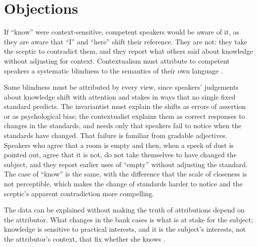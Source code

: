 \documentclass{situationist-preprint}
\begin{document}
\section{Objections}

\begin{objection}
If \enquote{know} were context-sensitive, competent speakers would be aware of it, as they are aware that \enquote{I} and \enquote{here} shift their reference. They are not: they take the sceptic to contradict them, and they report what others said about knowledge without adjusting for context. Contextualism must attribute to competent speakers a systematic blindness to the semantics of their own language \citep{Schiffer1996}.
\end{objection}

\begin{reply}
Some blindness must be attributed by every view, since speakers' judgements about knowledge shift with attention and stakes in ways that no single fixed standard predicts. The invariantist must explain the shifts as errors of assertion or as psychological bias; the contextualist explains them as correct responses to changes in the standards, and needs only that speakers fail to notice when the standards have changed. That failure is familiar from gradable adjectives. Speakers who agree that a room is empty and then, when a speck of dust is pointed out, agree that it is not, do not take themselves to have changed the subject, and they report earlier uses of \enquote{empty} without adjusting the standard. The case of \enquote{know} is the same, with the difference that the scale of closeness is not perceptible, which makes the change of standards harder to notice and the sceptic's apparent contradiction more compelling.
\end{reply}

\begin{objection}
The data can be explained without making the truth of attributions depend on the attributor. What changes in the bank cases is what is at stake for the subject; knowledge is sensitive to practical interests, and it is the subject's interests, not the attributor's context, that fix whether she knows \citep{Hawthorne2004,Stanley2005}.
\end{objection}
\end{document}
